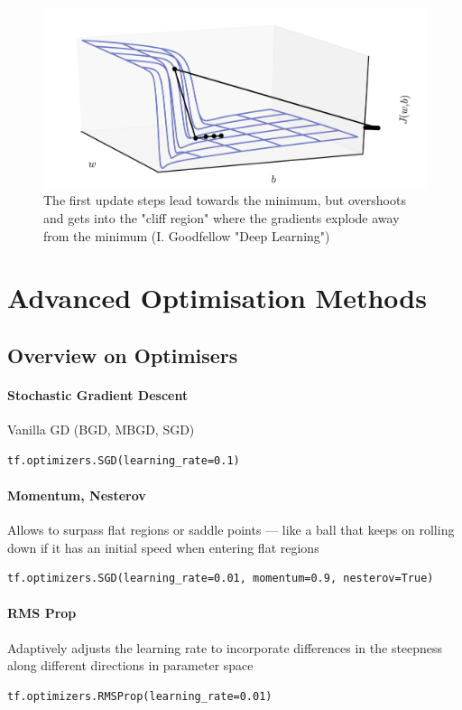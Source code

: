 \documentclass[11pt]{article}
\begin{document}
\begin{figure}[H]
	\centering
	\includegraphics[width=0.6\linewidth, keepaspectratio]{exploding_gradients_intuition}
	\caption{The first update steps lead towards the minimum, but overshoots and gets into the "cliff region" where the gradients explode away from the minimum (I. Goodfellow "Deep Learning")}
	\label{fig:explodinggradientsintuition}
\end{figure}

\section{Advanced Optimisation Methods}
\subsection{Overview on Optimisers}
\paragraph{Stochastic Gradient Descent} Vanilla GD (BGD, MBGD, SGD)
\begin{verbatim}
tf.optimizers.SGD(learning_rate=0.1)
\end{verbatim}
\paragraph{Momentum, Nesterov} Allows to surpass flat regions or saddle points — like a ball that keeps on rolling down if it has an initial speed when entering flat regions
\begin{verbatim}
tf.optimizers.SGD(learning_rate=0.01, momentum=0.9, nesterov=True)
\end{verbatim}
\paragraph{RMS Prop} Adaptively adjusts the learning rate to incorporate differences in the steepness along different directions in parameter space
\begin{verbatim}
tf.optimizers.RMSProp(learning_rate=0.01)
\end{verbatim}
\end{document}
